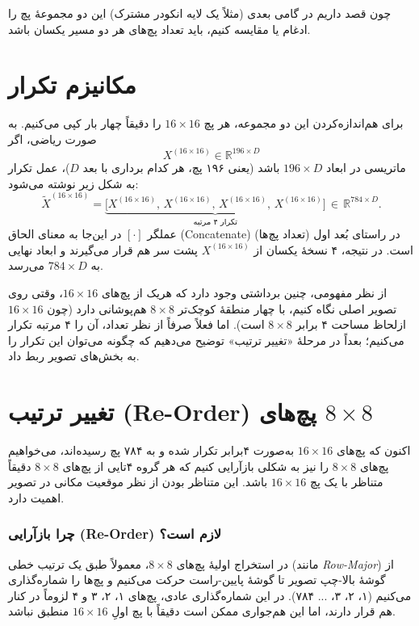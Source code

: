 چون قصد داریم در گامی بعدی (مثلاً یک لایه انکودر مشترک) این دو مجموعهٔ پچ را ادغام یا مقایسه کنیم، باید تعداد پچ‌های هر دو مسیر یکسان باشد.

\section*{مکانیزم تکرار}

برای هم‌اندازه‌کردن این دو مجموعه، هر پچ $16 \times 16$ را دقیقاً چهار بار کپی می‌کنیم. به صورت ریاضی، اگر 
\[
X^{(16\times16)} \in \mathbb{R}^{196 \times D}
\]
ماتریسی در ابعاد $196 \times D$ باشد (یعنی ۱۹۶ پچ، هر کدام برداری با بعد $D$)، عمل تکرار به شکل زیر نوشته می‌شود:
\[
\tilde{X}^{(16\times16)} 
= 
\underbrace{ \bigl[X^{(16\times16)},\, X^{(16\times16)},\, X^{(16\times16)},\, X^{(16\times16)}\bigr] }_{\text{تکرار ۴ مرتبه}}
\, \in\, \mathbb{R}^{784 \times D}.
\]
عملگر $[\cdot]$ در این‌جا به معنای الحاق (Concatenate) در راستای بُعد اول (تعداد پچ‌ها) است. در نتیجه، ۴ نسخهٔ یکسان از $X^{(16\times16)}$ پشت سر هم قرار می‌گیرند و ابعاد نهایی به $784 \times D$ می‌رسد.

از نظر مفهومی، چنین برداشتی وجود دارد که هریک از پچ‌های $16 \times 16$، وقتی روی تصویر اصلی نگاه کنیم، با چهار منطقهٔ کوچک‌تر $8 \times 8$ هم‌پوشانی دارد (چون $16\times16$ ازلحاظ مساحت ۴ برابر $8\times8$ است). اما فعلاً صرفاً از نظر تعداد، آن را ۴ مرتبه تکرار می‌کنیم؛ بعداً در مرحلهٔ «تغییر ترتیب» توضیح می‌دهیم که چگونه می‌توان این تکرار را به بخش‌های تصویر ربط داد.


\section*{تغییر ترتیب (Re-Order) پچ‌های $8 \times 8$}

اکنون که پچ‌های $16 \times 16$ به‌صورت ۴برابر تکرار شده و به ۷۸۴ پچ رسیده‌اند، می‌خواهیم پچ‌های $8 \times 8$ را نیز به شکلی بازآرایی کنیم که هر گروه ۴تایی از پچ‌های $8 \times 8$ دقیقاً متناظر با یک پچ $16 \times 16$ باشد. این متناظر بودن از نظر موقعیت مکانی در تصویر اهمیت دارد.

\subsubsection*{چرا بازآرایی (Re-Order) لازم است؟}
در استخراج اولیهٔ پچ‌های $8 \times 8$، معمولاً طبق یک ترتیب خطی (مانند \textit{Row-Major}) از گوشهٔ بالا-چپ تصویر تا گوشهٔ پایین-راست حرکت می‌کنیم و پچ‌ها را شماره‌گذاری می‌کنیم (۱، ۲، ۳، ... ۷۸۴). در این شماره‌گذاری عادی، پچ‌های ۱، ۲، ۳ و ۴ لزوماً در کنار هم قرار دارند، اما این هم‌جواری ممکن است دقیقاً با پچ اولِ $16 \times 16$ منطبق نباشد.

